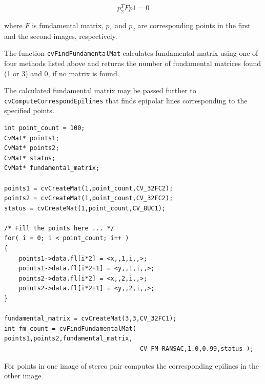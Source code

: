 \[ p_2^T F p1=0 \]

where $F$ is fundamental matrix, $p_1$ and $p_2$ are corresponding points in the first and the second images, respectively.

The function \texttt{cvFindFundamentalMat} calculates fundamental
matrix using one of four methods listed above and returns the number
of fundamental matrices found (1 or 3) and 0, if no matrix is found.

The calculated fundamental matrix may be passed further to
\texttt{cvComputeCorrespondEpilines} that finds epipolar lines
corresponding to the specified points.

\begin{lstlisting}
int point_count = 100;
CvMat* points1;
CvMat* points2;
CvMat* status;
CvMat* fundamental_matrix;

points1 = cvCreateMat(1,point_count,CV_32FC2);
points2 = cvCreateMat(1,point_count,CV_32FC2);
status = cvCreateMat(1,point_count,CV_8UC1);

/* Fill the points here ... */
for( i = 0; i < point_count; i++ )
{
    points1->data.fl[i*2] = <x,,1,i,,>;
    points1->data.fl[i*2+1] = <y,,1,i,,>;
    points2->data.fl[i*2] = <x,,2,i,,>;
    points2->data.fl[i*2+1] = <y,,2,i,,>;
}

fundamental_matrix = cvCreateMat(3,3,CV_32FC1);
int fm_count = cvFindFundamentalMat( points1,points2,fundamental_matrix,
                                     CV_FM_RANSAC,1.0,0.99,status );
\end{lstlisting}

\label{ComputeCorrespondEpilines}

For points in one image of stereo pair computes the corresponding epilines in the other image


\begin{description}
\end{description}

